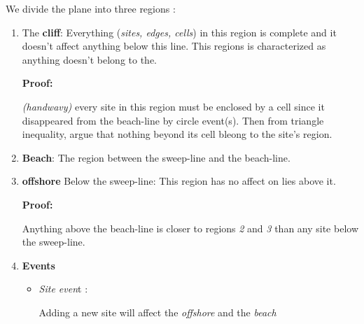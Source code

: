 \documentclass{article}
\begin{document}
We divide the plane into three regions :
\begin{enumerate}
    \item The \textbf{cliff}: Everything (\textit{sites, edges, cells}) in this region is complete and it doesn't affect anything below this line. This regions is characterized as anything doesn't belong to the. 
    
    \textbf{Proof:}
    
    {\color{red} \textit{(handwavy)}} every site in this region must be enclosed by a cell since it disappeared from the beach-line by circle event(s). Then from triangle inequality, argue that nothing beyond its cell bleong to the site's region.
    
    \item \textbf{Beach}: The region between the sweep-line and the beach-line.
    \item \textbf{offshore} Below the sweep-line: This region has no affect on lies above it.
    
    \textbf{Proof:}
    
    Anything above the beach-line is closer to regions \textit{2} and \textit{3} than any site below the sweep-line.
    \item \textbf{Events}
    \begin{itemize}
        \item \textit{Site even}t :
            \begin{displayquote}
            Adding a new site will affect the {\it{offshore}} and the \it{beach} 
            \end{displayquote}
            

\end{itemize}
\end{enumerate}
\end{document}
